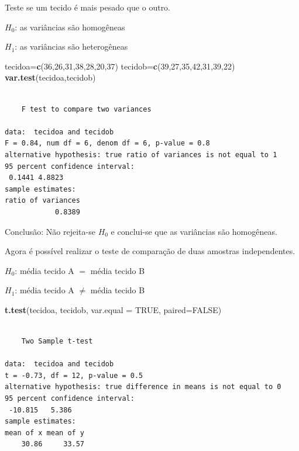 \documentclass[12pt,brazil,oneside]{book}
\newenvironment{Shaded}{\begin{snugshade}}{\end{snugshade}}
\newcommand{\DataTypeTok}[1]{\textcolor[rgb]{0.13,0.29,0.53}{#1}}
\newcommand{\DecValTok}[1]{\textcolor[rgb]{0.00,0.00,0.81}{#1}}
\newcommand{\KeywordTok}[1]{\textcolor[rgb]{0.13,0.29,0.53}{\textbf{#1}}}
\newcommand{\NormalTok}[1]{#1}
\newcommand{\OtherTok}[1]{\textcolor[rgb]{0.56,0.35,0.01}{#1}}
\begin{document}
Teste se um tecido é mais pesado que o outro.

\textbf{\(H_0\)}: as variâncias são homogêneas

\textbf{\(H_1\)}: as variâncias são heterogêneas

\begin{Shaded}
\begin{Highlighting}[]
\NormalTok{tecidoa=}\KeywordTok{c}\NormalTok{(}\DecValTok{36}\NormalTok{,}\DecValTok{26}\NormalTok{,}\DecValTok{31}\NormalTok{,}\DecValTok{38}\NormalTok{,}\DecValTok{28}\NormalTok{,}\DecValTok{20}\NormalTok{,}\DecValTok{37}\NormalTok{)}
\NormalTok{tecidob=}\KeywordTok{c}\NormalTok{(}\DecValTok{39}\NormalTok{,}\DecValTok{27}\NormalTok{,}\DecValTok{35}\NormalTok{,}\DecValTok{42}\NormalTok{,}\DecValTok{31}\NormalTok{,}\DecValTok{39}\NormalTok{,}\DecValTok{22}\NormalTok{)}
\KeywordTok{var.test}\NormalTok{(tecidoa,tecidob)}
\end{Highlighting}
\end{Shaded}

\begin{verbatim}

    F test to compare two variances

data:  tecidoa and tecidob
F = 0.84, num df = 6, denom df = 6, p-value = 0.8
alternative hypothesis: true ratio of variances is not equal to 1
95 percent confidence interval:
 0.1441 4.8823
sample estimates:
ratio of variances 
            0.8389 
\end{verbatim}

Conclusão: Não rejeita-se \(H_0\) e conclui-se que as variâncias são homogêneas.

Agora é possível realizar o teste de comparação de duas amostras independentes.

\textbf{\(H_0\)}: média tecido A \(=\) média tecido B

\textbf{\(H_1\)}: média tecido A \(\neq\) média tecido B

\begin{Shaded}
\begin{Highlighting}[]
\KeywordTok{t.test}\NormalTok{(tecidoa, tecidob, }\DataTypeTok{var.equal =} \OtherTok{TRUE}\NormalTok{, }\DataTypeTok{paired=}\OtherTok{FALSE}\NormalTok{)}
\end{Highlighting}
\end{Shaded}

\begin{verbatim}

    Two Sample t-test

data:  tecidoa and tecidob
t = -0.73, df = 12, p-value = 0.5
alternative hypothesis: true difference in means is not equal to 0
95 percent confidence interval:
 -10.815   5.386
sample estimates:
mean of x mean of y 
    30.86     33.57 
\end{verbatim}
\end{document}
